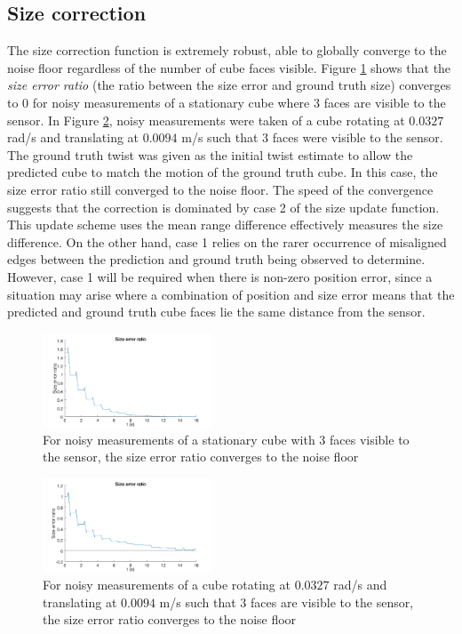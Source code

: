 \subsection{Size correction}
The size correction function is extremely robust, able to globally converge to the noise floor regardless of the number of cube faces visible. 
Figure \ref{fig:size_stationary} shows that the \textit{size error ratio} (the ratio between the size error and ground truth size) converges to 0 for noisy measurements of a stationary cube where 3 faces are visible to the sensor. 
In Figure \ref{fig:size_RT_noise}, noisy measurements were taken of a cube rotating at $0.0327$ rad/s and translating at $0.0094$ m/s such that 3 faces were visible to the sensor. The ground truth twist was given as the initial twist estimate to allow the predicted cube to match the motion of the ground truth cube. In this case, the size error ratio still converged to the noise floor.
The speed of the convergence suggests that the correction is dominated by case 2 of the size update function. This update scheme uses the mean range difference effectively measures the size difference. On the other hand, case 1 relies on the rarer occurrence of misaligned edges between the prediction and ground truth being observed to determine.
However, case 1 will be required when there is non-zero position error, since a situation may arise where a combination of position and size error means that the predicted and ground truth cube faces lie the same distance from the sensor.

\begin{figure}[h]
	\centering
  	\includegraphics[width=0.45\textwidth,trim = 0mm 0mm 0mm 0mm,clip]{./Figures/size_error_ratio_1}\vspace*{0ex}
	\caption{For noisy measurements of a stationary cube with 3 faces visible to the sensor, the size error ratio converges to the noise floor}
  	\label{fig:size_stationary}
\end{figure}

\begin{figure}[h]
	\centering
  	\includegraphics[width=0.45\textwidth,trim = 0mm 0mm 0mm 0mm,clip]{./Figures/size_error_ratio_2_RT_noise}\vspace*{0ex}
	\caption{For noisy measurements of a cube rotating at $0.0327$ rad/s and translating at $0.0094$ m/s such that 3 faces are visible to the sensor, the size error ratio converges to the noise floor}
  	\label{fig:size_RT_noise}
\end{figure}

